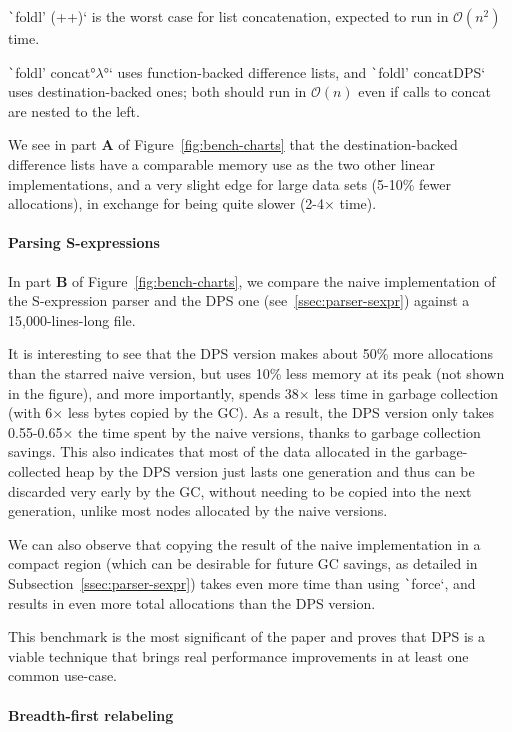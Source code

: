 \documentclass[english]{jflart}
\begin{document}
\texttt`foldl' (++)` is the worst case for list concatenation, expected to run in $\mathcal{O}(n^2)$ time.

\texttt`foldl' concat°$\lambda$°` uses function-backed difference lists, and \texttt`foldl' concatDPS` uses destin\-ation-backed ones; both should run in $\mathcal{O}(n)$ even if calls to concat are nested to the left.

We see in part \textbf{A} of Figure~\ref{fig:bench-charts} that the destination-backed difference lists have a comparable memory use as the two other linear implementations, and a very slight edge for large data sets (5-10\% fewer allocations), in exchange for being quite slower (2-4$\times$ time).

\paragraph{Parsing S-expressions}

In part \textbf{B} of Figure~\ref{fig:bench-charts}, we compare the naive implementation of the S-expression parser and the DPS one (see~\ref{ssec:parser-sexpr}) against a 15,000-lines-long file.

It is interesting to see that the DPS version makes about 50\% more allocations than the starred naive version, but uses 10\% less memory at its peak (not shown in the figure), and more importantly, spends 38$\times$ less time in garbage collection (with 6$\times$ less bytes copied by the GC). As a result, the DPS version only takes 0.55-0.65$\times$ the time spent by the naive versions, thanks to garbage collection savings. This also indicates that most of the data allocated in the garbage-collected heap by the DPS version just lasts one generation and thus can be discarded very early by the GC, without needing to be copied into the next generation, unlike most nodes allocated by the naive versions.

We can also observe that copying the result of the naive implementation in a compact region (which can be desirable for future GC savings, as detailed in Subsection~\ref{ssec:parser-sexpr}) takes even more time than using \texttt`force`, and results in even more total allocations than the DPS version.

This benchmark is the most significant of the paper and proves that DPS is a viable technique that brings real performance improvements in at least one common use-case.

\paragraph{Breadth-first relabeling}\label{par:benchmark-bf-tree-traversal}
\end{document}
